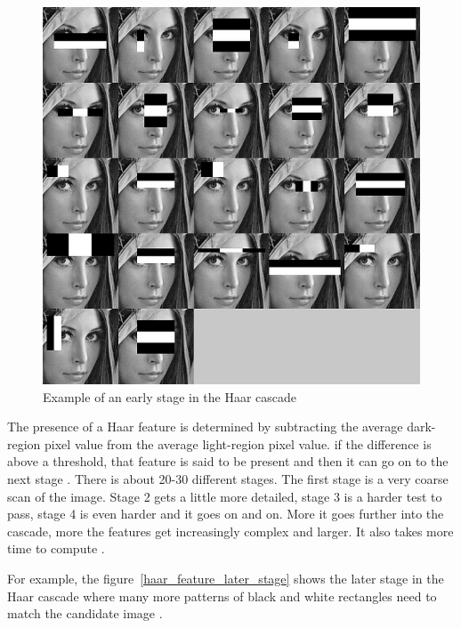 \begin{figure}[!h]
\begin{center}
\noindent \includegraphics[scale=0.5]{figures/haar_features_early_stage} 
\newline
\caption{Example of an early stage in the Haar cascade}
\label{haar_features_early_stage}
\end{center} 
\end{figure}

\noindent The presence of a Haar feature is determined by subtracting the average dark-region pixel value from the average light-region pixel value. if the difference is above a threshold, that feature is said to be present and then it can go on to the next stage \cite{HEW07}. There is about 20-30 different stages. The first stage is a very coarse scan of the image. Stage 2 gets a little more detailed, stage 3 is a harder test to pass, stage 4 is even harder and it goes on and on. More it goes further into the cascade, more the features get increasingly complex and larger. It also takes more time to compute \cite{HAR12}.
\newline

\noindent For example, the figure~\ref{haar_feature_later_stage} shows the later stage in the Haar cascade where many more patterns of black and white rectangles need to match the candidate image \cite{HAR12}.
\newline

